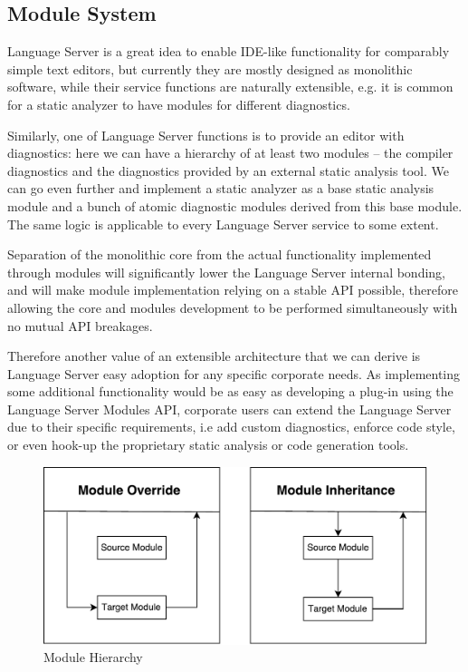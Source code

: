 \subsection{Module System}
\label{sec:met:arch:ms}

Language Server is a great idea to enable IDE-like functionality for
comparably simple text editors, but currently they are mostly designed as 
monolithic software, while their service functions are naturally extensible, 
e.g. it is common for a static analyzer to have modules for different diagnostics.

Similarly, one of Language Server functions is to provide an editor with diagnostics: here we can 
have a hierarchy of at least two modules -- the compiler diagnostics and the diagnostics provided by an external static analysis tool.
We can go even further and implement a static analyzer as a base static analysis module and a bunch of atomic diagnostic modules derived from this base module. 
The same logic is applicable to every Language Server service to some extent.

Separation of the monolithic core from the actual functionality implemented through modules
will significantly lower the Language Server internal bonding, and will make
module implementation relying on a stable API possible, therefore allowing the core and modules
development to be performed simultaneously with no mutual API breakages.

Therefore another value of an extensible architecture that we can derive is 
Language Server easy adoption for any specific corporate needs. 
As implementing some additional functionality would be as easy as developing a plug-in using 
the Language Server Modules API, corporate users can extend the Language Server 
due to their specific requirements, i.e add custom diagnostics, enforce code style, 
or even hook-up the proprietary static analysis or code generation tools.

\begin{figure}[H]
    \centering
    \includegraphics[width=.7\textwidth]{figs/module_hierarchy.pdf}
    \caption{Module Hierarchy}
\end{figure}

